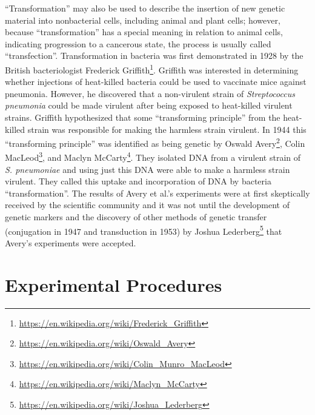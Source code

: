 \documentclass[]{book}
\let\rmarkdownfootnote\footnote%
\def\footnote{\protect\rmarkdownfootnote}
\renewcommand{\href}[2]{#2\footnote{\url{#1}}}
\begin{document}
``Transformation'' may also be used to describe the insertion of new genetic material into nonbacterial cells, including animal and plant cells; however, because ``transformation'' has a special meaning in relation to animal cells, indicating progression to a cancerous state, the process is usually called ``transfection''.
Transformation in bacteria was first demonstrated in 1928 by the British bacteriologist \href{https://en.wikipedia.org/wiki/Frederick_Griffith}{Frederick Griffith}. Griffith was interested in determining whether injections of heat-killed bacteria could be used to vaccinate mice against pneumonia. However, he discovered that a non-virulent strain of \emph{Streptococcus pneumonia} could be made virulent after being exposed to heat-killed virulent strains. Griffith hypothesized that some ``transforming principle'' from the heat-killed strain was responsible for making the harmless strain virulent. In 1944 this ``transforming principle'' was identified as being genetic by \href{https://en.wikipedia.org/wiki/Oswald_Avery}{Oswald Avery}, \href{https://en.wikipedia.org/wiki/Colin_Munro_MacLeod}{Colin MacLeod}, and \href{https://en.wikipedia.org/wiki/Maclyn_McCarty}{Maclyn McCarty}. They isolated DNA from a virulent strain of \emph{S. pneumoniae} and using just this DNA were able to make a harmless strain virulent. They called this uptake and incorporation of DNA by bacteria ``transformation''. The results of Avery et al.'s experiments were at first skeptically received by the scientific community and it was not until the development of genetic markers and the discovery of other methods of genetic transfer (conjugation in 1947 and transduction in 1953) by \href{https://en.wikipedia.org/wiki/Joshua_Lederberg}{Joshua Lederberg} that Avery's experiments were accepted.

\hypertarget{experimental-procedures-15}{%
\section{Experimental Procedures}\label{experimental-procedures-15}}
\end{document}
